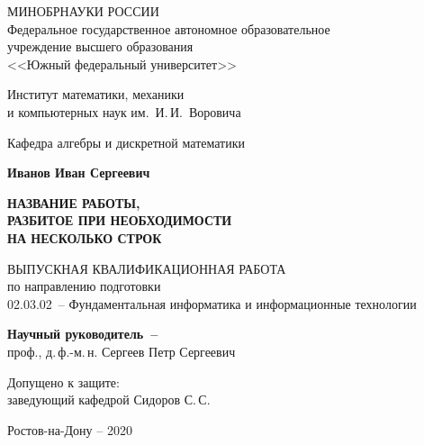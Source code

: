 


\thispagestyle{empty}
\begin{singlespacing}
\begin{center}

МИНОБРНАУКИ РОССИИ\\ [12pt]
Федеральное государственное автономное образовательное\\
учреждение высшего образования\\
<<Южный федеральный университет>>

\vspace{\baselineskip}
Институт математики, механики\\
и компьютерных наук им.~И.\,И.~Воровича

\vspace{\baselineskip}
Кафедра алгебры и дискретной математики

\vfill
\textbf{Иванов Иван Сергеевич}

\vspace{\baselineskip}
{\bf НАЗВАНИЕ РАБОТЫ, \\
РАЗБИТОЕ ПРИ НЕОБХОДИМОСТИ \\
НА НЕСКОЛЬКО СТРОК }

\vspace{15mm}
ВЫПУСКНАЯ КВАЛИФИКАЦИОННАЯ РАБОТА\\
по направлению подготовки\\
02.03.02~-- Фундаментальная информатика и информационные технологии


\vspace{10mm}
\textbf{Научный руководитель~--}\\
проф., д.\,ф.-м.\,н. Сергеев Петр Сергеевич

\vspace{15mm}

\noindent
\begin{flushleft}
Допущено к защите:\\
заведующий кафедрой \underline{\hspace*{65mm}} Сидоров С.\,С.
\end{flushleft}




\vfill
Ростов-на-Дону -- 2020

\end{center}

\singlespacing
\end{singlespacing} 